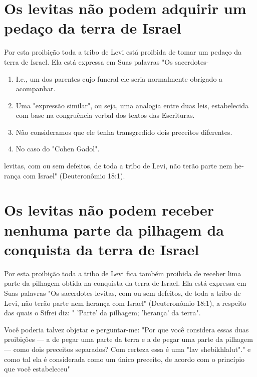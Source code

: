 \begin{itemize}
\begin{enumrate}
\begin{itemize}
\begin{itemize}
\begin{itemize}
\section{Os levitas não podem adquirir um pedaço da terra de Israel}

Por esta proibição toda a tribo de Levi está proibida de tomar um pedaço
da terra de Israel. Ela está expressa em Suas palavras "Os sacerdotes-


\begin{enumerate}
\def\labelenumi{\arabic{enumi}.}
\setcounter{enumi}{335}
\item
 
 I.e., um dos parentes cujo funeral ele seria normalmente obrigado a
 acompanhar.
 
\item
 
 Uma "expressão similar", ou seja, uma analogia entre duas leis,
 estabelecida com base na con­gruência verbal dos textos das
 Escrituras.
 
\item
 
 Não consideramos que ele tenha transgredido dois preceitos diferentes.
 
\item
 
 No caso do "Cohen Gadol".
 
\end{enumerate}

levitas, com ou sem defeitos, de toda a tribo de Levi, não terão parte
nem he­rança com Israel" (Deuteronômio 18:1).

\section{Os levitas não podem receber nenhuma parte da pilhagem da conquista
da terra de Israel}

Por esta proibição toda a tribo de Levi fica também proibida de re­ceber
lima parte da pilhagem obtida na conquista da terra de Israel. Ela está
expressa em Suas palavras "Os sacerdotes-levitas, com ou sem defeitos,
de to­da a tribo de Levi, não terão parte nem herança com Israel"
(Deuteronômio 18:1), a respeito das quais o Sifrei diz: " 'Parte' da
pilhagem; 'herança' da terra".

Você poderia talvez objetar e perguntar-me: "Por que você conside­ra
essas duas proibições --- a de pegar uma parte da terra e a de pegar uma
parte da pilhagem --- como dois preceitos separados? Com certeza essa é
uma "lav shebikhlalut"." e como tal ela é considerada
como um único preceito, de acordo com o princípio que você estabeleceu"


\end{itemize}
\end{itemize}
\end{itemize}
\end{enumrate}
\end{itemize}

